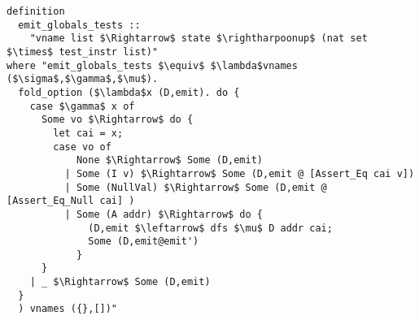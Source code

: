 \begin{lstlisting}[mathescape=true, frame=single]
definition
  emit_globals_tests ::
    "vname list $\Rightarrow$ state $\rightharpoonup$ (nat set $\times$ test_instr list)"
where "emit_globals_tests $\equiv$ $\lambda$vnames ($\sigma$,$\gamma$,$\mu$).
  fold_option ($\lambda$x (D,emit). do {
    case $\gamma$ x of
      Some vo $\Rightarrow$ do {
        let cai = x;
        case vo of
            None $\Rightarrow$ Some (D,emit)
          | Some (I v) $\Rightarrow$ Some (D,emit @ [Assert_Eq cai v])
          | Some (NullVal) $\Rightarrow$ Some (D,emit @ [Assert_Eq_Null cai] )
          | Some (A addr) $\Rightarrow$ do {
              (D,emit $\leftarrow$ dfs $\mu$ D addr cai;
              Some (D,emit@emit')
            }
      }
    | _ $\Rightarrow$ Some (D,emit)
  }
  ) vnames ({},[])"
\end{lstlisting}

